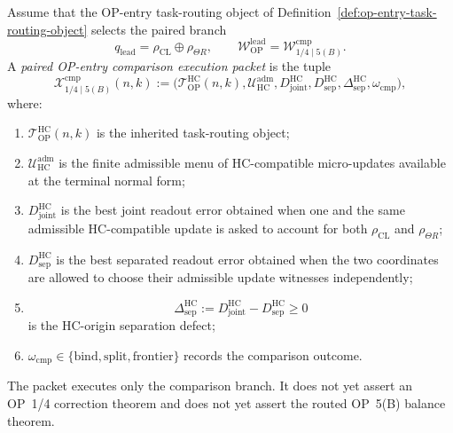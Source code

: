 \begin{definition}
\label{def:paired-op-entry-comparison-execution-packet}
Assume that the OP-entry task-routing object of Definition~\ref{def:op-entry-task-routing-object} selects the paired branch
\[
 q_{\mathrm{lead}}=\rho_{\mathrm{CL}}\oplus\rho_{\Theta R},
 \qquad
 \mathcal W_{\mathrm{OP}}^{\mathrm{lead}}
 =\mathcal W_{1/4\mid 5(B)}^{\mathrm{cmp}}.
\]
A \emph{paired OP-entry comparison execution packet} is the tuple
\[
 \mathcal X_{1/4\mid 5(B)}^{\mathrm{cmp}}(n,k)
 :=
 \bigl(
 \mathcal T_{\mathrm{OP}}^{\mathrm{HC}}(n,k),
 \mathcal U_{\mathrm{HC}}^{\mathrm{adm}},
 D_{\mathrm{joint}}^{\mathrm{HC}},
 D_{\mathrm{sep}}^{\mathrm{HC}},
 \Delta_{\mathrm{sep}}^{\mathrm{HC}},
 \omega_{\mathrm{cmp}}
 \bigr),
\]
where:
\begin{enumerate}[leftmargin=2em,label=(\alph*)]
 \item $\mathcal T_{\mathrm{OP}}^{\mathrm{HC}}(n,k)$ is the inherited task-routing object;
 \item $\mathcal U_{\mathrm{HC}}^{\mathrm{adm}}$ is the finite admissible menu of HC-compatible micro-updates available at the terminal normal form;
 \item $D_{\mathrm{joint}}^{\mathrm{HC}}$ is the best joint readout error obtained when one and the same admissible HC-compatible update is asked to account for both $\rho_{\mathrm{CL}}$ and $\rho_{\Theta R}$;
 \item $D_{\mathrm{sep}}^{\mathrm{HC}}$ is the best separated readout error obtained when the two coordinates are allowed to choose their admissible update witnesses independently;
 \item
 \[
 \Delta_{\mathrm{sep}}^{\mathrm{HC}}
 :=D_{\mathrm{joint}}^{\mathrm{HC}}-D_{\mathrm{sep}}^{\mathrm{HC}}
 \geq 0
 \]
 is the HC-origin separation defect;
 \item $\omega_{\mathrm{cmp}}\in\{\mathrm{bind},\mathrm{split},\mathrm{frontier}\}$ records the comparison outcome.
\end{enumerate}
The packet executes only the comparison branch. It does not yet assert an OP~1/4 correction theorem and does not yet assert the routed OP~5(B) balance theorem.
\end{definition}

